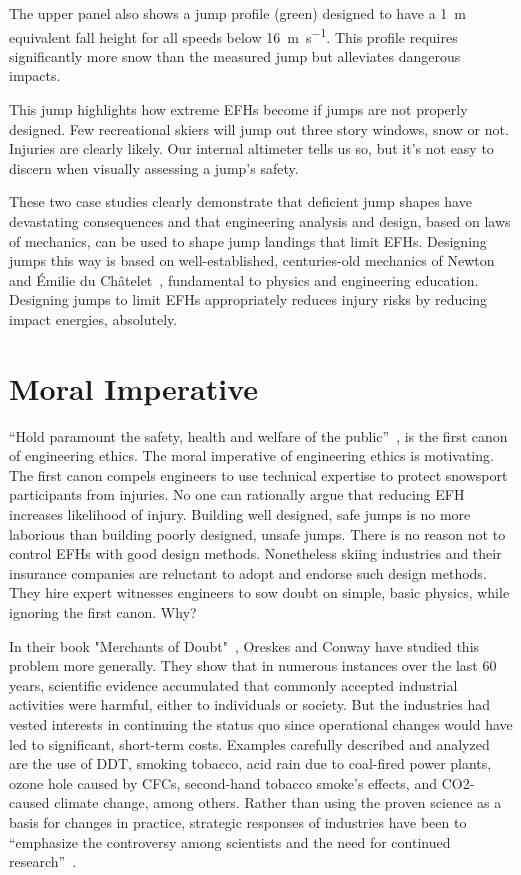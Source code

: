 \documentclass[smallextended]{svjour3}       %
\begin{document}
The upper panel also shows a jump profile (green) designed to have a
1~\si{\meter} equivalent fall height for all speeds below
16~\si{\meter\per\second}. This profile requires significantly more snow than
the measured jump but alleviates dangerous impacts.

This jump highlights how extreme EFHs become if jumps are not properly
designed. Few recreational skiers will jump out three story windows, snow or
not. Injuries are clearly likely.  Our internal altimeter tells us so, but it's
not easy to discern when visually assessing a jump's safety.

These two case studies clearly demonstrate that deficient jump shapes have devastating
consequences and that engineering analysis and design, based on laws of
mechanics, can be used to shape jump landings that limit EFHs. Designing jumps
this way is based on well-established, centuries-old mechanics of Newton
and Émilie du Châtelet~\cite{Zinsser2007}, fundamental to physics and
engineering education. Designing jumps to limit EFHs appropriately reduces
injury risks by reducing impact energies, absolutely.

\section{Moral Imperative}
\label{sec:moral}
%
``Hold paramount the safety, health and welfare of the
public''~\cite{NSPE2019}, is the first canon of engineering ethics. The moral
imperative of engineering ethics is motivating. The first canon compels
engineers to use technical expertise to protect snowsport participants from
injuries. No one can rationally argue that reducing EFH increases
likelihood of injury. Building well designed, safe jumps is no more
laborious than building poorly designed, unsafe jumps. There is no reason not
to control EFHs with good design methods. Nonetheless skiing industries and
their insurance companies are reluctant to adopt and endorse such design
methods. They hire expert witnesses engineers to sow doubt on simple, basic
physics, while ignoring the first canon. Why?

In their book "Merchants of Doubt"~\cite{Oreskes2010}, Oreskes and Conway have
studied this problem more generally.  They show that in numerous instances over
the last 60 years, scientific evidence accumulated that commonly accepted
industrial activities were harmful, either to individuals or society. But the
industries had vested interests in continuing the status quo since operational
changes would have led to significant, short-term costs. Examples carefully
described and analyzed~\cite{Oreskes2010} are the use of DDT, smoking tobacco,
acid rain due to coal-fired power plants, ozone hole caused by CFCs,
second-hand tobacco smoke’s effects, and CO2-caused climate change, among
others. Rather than using the proven science as a basis for changes in
practice, strategic responses of industries have been to ``emphasize the
controversy among scientists and the need for continued
research''~\cite{Oreskes2010}.
\end{document}
